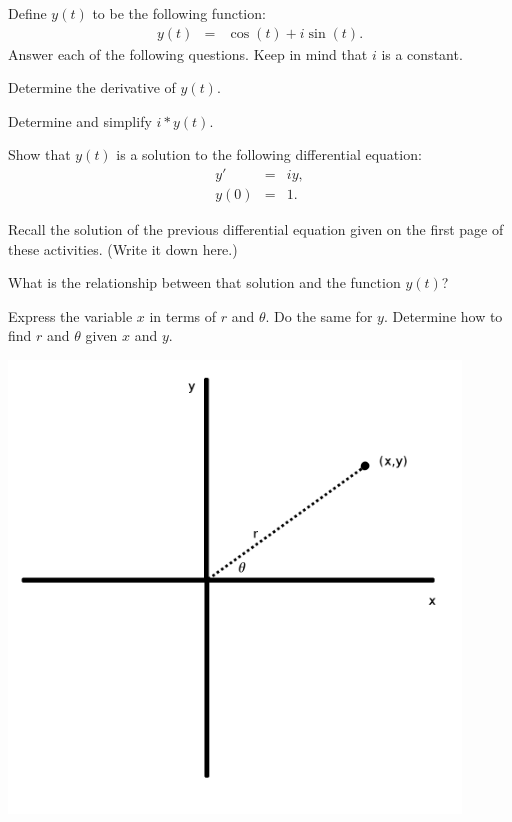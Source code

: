   \begin{problem}

  \item Define $y(t)$ to be the following function:
    \begin{eqnarray*}
      y(t) & = & \cos(t) + i \sin(t).
    \end{eqnarray*}
    Answer each of the following questions. Keep in mind that $i$ is a
    constant.

    \begin{subproblem}
      \item Determine the derivative of $y(t)$. 
        \vfill

      \item Determine and simplify $i*y(t)$.
        \vfill

        \clearpage

      \item Show that $y(t)$ is a solution to the following
        differential equation:
        \begin{eqnarray*}
          y' & = & i y, \\
          y(0) & = & 1.
        \end{eqnarray*}

        \vfill

      \item Recall the solution of the previous differential equation
        given on the first page of these activities. (Write it down here.)
        \vfill

      \item What is the relationship between that solution and the
        function $y(t)$?
        \vfill
        

    \end{subproblem}

    \clearpage

  \item Express the variable $x$ in terms of $r$ and $\theta$. Do the
    same for $y$. Determine how to find $r$ and $\theta$ given $x$ and
    $y$. 

    \includegraphics[height=12cm]{polar}
    \vfill


  \end{problem}
